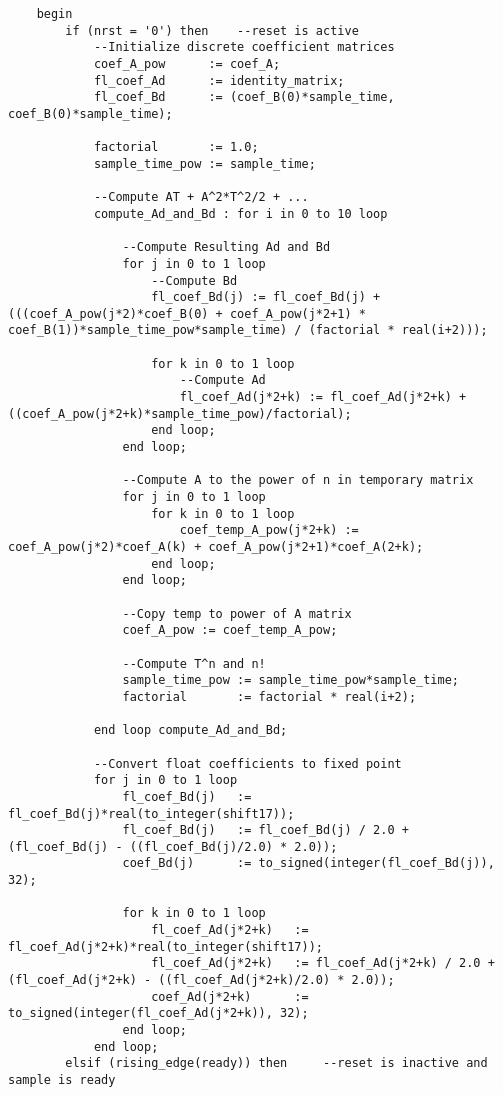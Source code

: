 \begin{lstlisting}
    begin
        if (nrst = '0') then    --reset is active
            --Initialize discrete coefficient matrices
            coef_A_pow      := coef_A;
            fl_coef_Ad      := identity_matrix;
            fl_coef_Bd      := (coef_B(0)*sample_time, coef_B(0)*sample_time);

            factorial       := 1.0;
            sample_time_pow := sample_time;

            --Compute AT + A^2*T^2/2 + ...
            compute_Ad_and_Bd : for i in 0 to 10 loop

                --Compute Resulting Ad and Bd
                for j in 0 to 1 loop
                    --Compute Bd
                    fl_coef_Bd(j) := fl_coef_Bd(j) + (((coef_A_pow(j*2)*coef_B(0) + coef_A_pow(j*2+1) * coef_B(1))*sample_time_pow*sample_time) / (factorial * real(i+2)));

                    for k in 0 to 1 loop
                        --Compute Ad
                        fl_coef_Ad(j*2+k) := fl_coef_Ad(j*2+k) + ((coef_A_pow(j*2+k)*sample_time_pow)/factorial);
                    end loop;
                end loop;

                --Compute A to the power of n in temporary matrix 
                for j in 0 to 1 loop
                    for k in 0 to 1 loop
                        coef_temp_A_pow(j*2+k) := coef_A_pow(j*2)*coef_A(k) + coef_A_pow(j*2+1)*coef_A(2+k);
                    end loop;
                end loop;

                --Copy temp to power of A matrix
                coef_A_pow := coef_temp_A_pow;

                --Compute T^n and n!
                sample_time_pow := sample_time_pow*sample_time;
                factorial       := factorial * real(i+2);

            end loop compute_Ad_and_Bd;

            --Convert float coefficients to fixed point
            for j in 0 to 1 loop
                fl_coef_Bd(j)   := fl_coef_Bd(j)*real(to_integer(shift17));
                fl_coef_Bd(j)   := fl_coef_Bd(j) / 2.0 + (fl_coef_Bd(j) - ((fl_coef_Bd(j)/2.0) * 2.0));
                coef_Bd(j)      := to_signed(integer(fl_coef_Bd(j)), 32);

                for k in 0 to 1 loop 
                    fl_coef_Ad(j*2+k)   := fl_coef_Ad(j*2+k)*real(to_integer(shift17));
                    fl_coef_Ad(j*2+k)   := fl_coef_Ad(j*2+k) / 2.0 + (fl_coef_Ad(j*2+k) - ((fl_coef_Ad(j*2+k)/2.0) * 2.0));
                    coef_Ad(j*2+k)      := to_signed(integer(fl_coef_Ad(j*2+k)), 32);
                end loop;
            end loop;
        elsif (rising_edge(ready)) then     --reset is inactive and sample is ready


\end{lstlisting}

